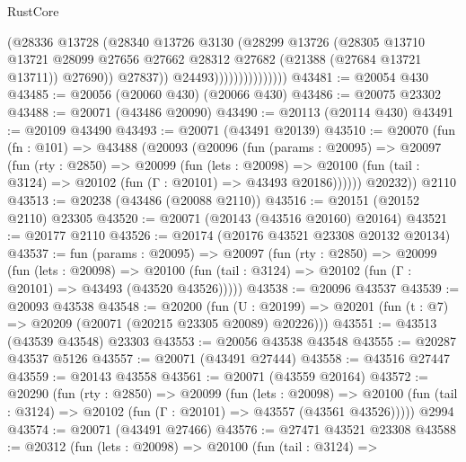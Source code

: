 \begin{lexlean}{RustCore}
\begin{coremodule}
                                  (@28336
                                    @13728
                                    (@28340
                                      @13726
                                      @3130
                                      (@28299
                                        @13726
                                        (@28305
                                          @13710
                                          @13721
                                          @28099
                                          @27656
                                          @27662
                                          @28312
                                          @27682
                                          (@21388 (@27684 @13721 @13711))
                                          @27690))
                                      @27837))
                                  @24493)))))))))))))))
@43481 := @20054 @430
@43485 := @20056 (@20060 @430) (@20066 @430)
@43486 := @20075 @23302
@43488 := @20071 (@43486 @20090)
@43490 := @20113 (@20114 @430)
@43491 := @20109 @43490
@43493 := @20071 (@43491 @20139)
@43510 := @20070
    (fun (fn : @101) =>
    @43488
      (@20093
        (@20096
          (fun (params : @20095) =>
          @20097
            (fun (rty : @2850) =>
            @20099
              (fun (lets : @20098) =>
              @20100 (fun (tail : @3124) => @20102 (fun (Γ : @20101) => @43493 @20186))))))
        @20232))
    @2110
@43513 := @20238 (@43486 (@20088 @2110))
@43516 := @20151 (@20152 @2110) @23305
@43520 := @20071 (@20143 (@43516 @20160) @20164)
@43521 := @20177 @2110
@43526 := @20174 (@20176 @43521 @23308 @20132 @20134)
@43537 := fun (params : @20095) =>
  @20097
    (fun (rty : @2850) =>
    @20099
      (fun (lets : @20098) =>
      @20100 (fun (tail : @3124) => @20102 (fun (Γ : @20101) => @43493 (@43520 @43526)))))
@43538 := @20096 @43537
@43539 := @20093 @43538
@43548 := @20200
    (fun (U : @20199) => @20201 (fun (t : @7) => @20209 (@20071 (@20215 @23305 @20089) @20226)))
@43551 := @43513 (@43539 @43548) @23303
@43553 := @20056 @43538 @43548
@43555 := @20287 @43537 @5126
@43557 := @20071 (@43491 @27444)
@43558 := @43516 @27447
@43559 := @20143 @43558
@43561 := @20071 (@43559 @20164)
@43572 := @20290
    (fun (rty : @2850) =>
    @20099
      (fun (lets : @20098) =>
      @20100 (fun (tail : @3124) => @20102 (fun (Γ : @20101) => @43557 (@43561 @43526)))))
    @2994
@43574 := @20071 (@43491 @27466)
@43576 := @27471 @43521 @23308
@43588 := @20312
    (fun (lets : @20098) =>
    @20100
      (fun (tail : @3124) =>

\end{coremodule}
\end{lexlean}
